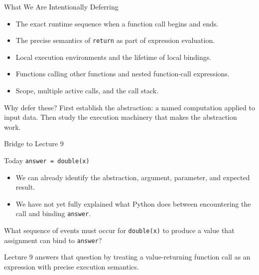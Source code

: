 \documentclass[aspectratio=169,10pt]{beamer}
\begin{document}
\begin{frame}{What We Are Intentionally Deferring}
  \begin{itemize}
    \item The exact runtime sequence when a function call begins and ends.
    \item The precise semantics of \texttt{return} as part of expression evaluation.
    \item Local execution environments and the lifetime of local bindings.
    \item Functions calling other functions and nested function-call expressions.
    \item Scope, multiple active calls, and the call stack.
  \end{itemize}

  \begin{block}{Why defer these?}
    First establish the abstraction: a named computation applied to input data. Then study the execution machinery that makes the abstraction work.
  \end{block}
\end{frame}

\begin{frame}{Bridge to Lecture 9}
  \begin{block}{Today}
    \centering
    \texttt{answer = double(x)}
  \end{block}

  \begin{itemize}
    \item We can already identify the abstraction, argument, parameter, and expected result.
    \item We have not yet fully explained what Python does between encountering the call and binding \texttt{answer}.
  \end{itemize}

  \begin{activity}
    What sequence of events must occur for \texttt{double(x)} to produce a value that assignment can bind to \texttt{answer}?
  \end{activity}

  \begin{keyidea}
    Lecture 9 answers that question by treating a value-returning function call as an expression with precise execution semantics.
  \end{keyidea}
\end{frame}
\end{document}
